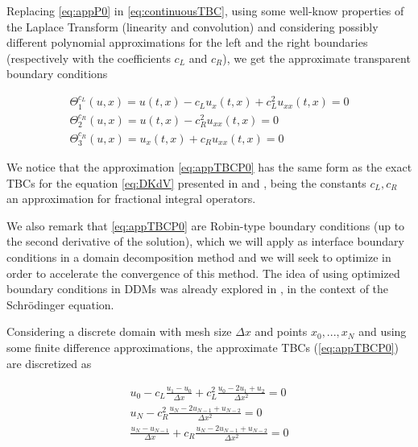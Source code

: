 \indent Replacing \eqref{eq:appP0} in \eqref{eq:continuousTBC}, using some well-know properties of the Laplace Transform (linearity and convolution) and considering possibly different polynomial approximations for the left and the right boundaries (respectively with the coefficients $c_L$ and $c_R$), we get the approximate transparent boundary conditions


\begin{equation}
  \label{eq:appTBCP0}
    \begin{gathered}
        \Theta_1^{c_L}(u,x) = u(t,x) - c_L u_x(t,x)  + c_L^2  u_{xx}(t,x) = 0 \\
        \Theta_2^{c_R}(u,x) =  u(t,x) - c_R^2    u_{xx}(t,x) = 0\\
        \Theta_3^{c_R} (u,x)= u_x(t,x) + c_R u_{xx}(t,x)  = 0
    \end{gathered}
\end{equation}

\indent We notice that the approximation \eqref{eq:appTBCP0} has the same form as the exact TBCs for the equation \eqref{eq:DKdV} presented in \cite{zheng2008} and \cite{besse2015}, being the constants $c_L,c_R$ an approximation for fractional integral operators. 

\begingroup
\color{red}
\indent We also remark that \eqref{eq:appTBCP0} are Robin-type boundary conditions (up to the second derivative of the solution), which we will apply as interface boundary conditions in a domain decomposition method and we will seek to optimize in order to accelerate the convergence of this method. The idea of using optimized boundary conditions in DDMs was already explored in \cite{Halpern2008}, in the context of the Schrödinger equation.
\endgroup

\indent Considering a discrete domain with mesh size $\Delta x$ and points $x_0, ..., x_N$ and using some finite difference approximations, the approximate TBCs (\ref{eq:appTBCP0}) are discretized as

\begin{equation}
\label{eq:appDiscTBCP0}
    \begin{gathered}
        u_0 - c_L \frac{u_1 - u_0}{\Delta x}  + c_L^2  \frac{u_0 -2u_1 + u_2}{\Delta x^2} = 0 \\
        u_N - c_R^2    \frac{u_N -2u_{N-1} + u_{N-2}}{\Delta x^2} = 0 \\
        \frac{u_N - u_{N-1}}{\Delta x}  + c_R    \frac{u_N -2u_{N-1} + u_{N-2}}{\Delta x^2} = 0 
    \end{gathered}
\end{equation}

